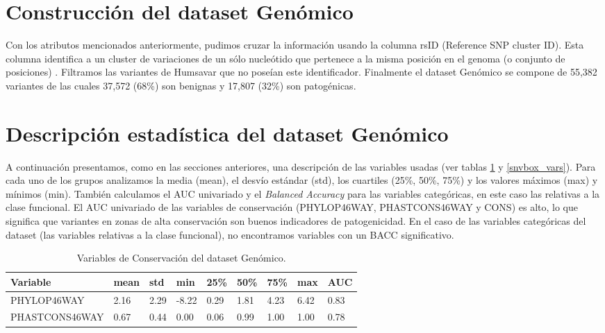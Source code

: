 \section{Construcción del dataset Genómico}

Con los atributos mencionados anteriormente, pudimos cruzar la información usando la columna rsID (Reference SNP cluster ID). Esta columna identifica a un cluster de variaciones de un sólo nucleótido que pertenece a la misma posición en el genoma (o conjunto de posiciones) \cite{Ostell2007}. Filtramos las variantes de Humsavar que no poseían este identificador. Finalmente el dataset Genómico se compone de 55,382 variantes de las cuales 37,572 (68\%) son benignas y 17,807 (32\%) son patogénicas. 

\section{Descripción estadística del dataset Genómico}

A continuación presentamos, como en las secciones anteriores, una descripción de las variables usadas (ver tablas \ref{conservacion_vars} y \ref{snvbox_vars}). Para cada uno de los grupos analizamos la media (mean), el desvío estándar (std), los cuartiles (25\%, 50\%, 75\%) y los valores máximos (max) y mínimos (min). También calculamos el AUC univariado y el \textit{Balanced Accuracy} para las variables categóricas, en este caso las relativas a la clase funcional. El AUC univariado de las variables de conservación (PHYLOP46WAY, PHASTCONS46WAY y CONS) es alto, lo que significa que variantes en zonas de alta conservación son buenos indicadores de patogenicidad. En el caso de las variables categóricas del dataset (las variables relativas a la clase funcional), no encontramos variables con un BACC significativo.

\begin{table}[H]
\centering
\begin{tabular}{|l|l|l|l|l|l|l|l|l|}
\hline
Variable & mean & std & min & 25\%  & 50\% & 75\%  & max & AUC \\ \hline
PHYLOP46WAY & 2.16 &  2.29 & -8.22 &  0.29 &  1.81 &  4.23 &  6.42 & 0.83 \\ \hline
PHASTCONS46WAY & 0.67 & 0.44 &  0.00 &  0.06 &  0.99 &  1.00 &  1.00 & 0.78 \\ \hline
\end{tabular}
\caption{Variables de Conservación del dataset Genómico.}
\label{conservacion_vars}
\end{table}

